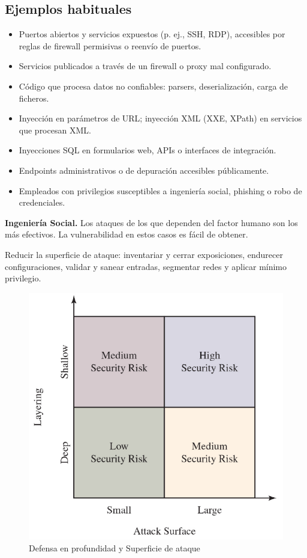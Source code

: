 \documentclass[11pt,a4paper]{article}
\begin{document}
    \subsection*{Ejemplos habituales}
    \begin{itemize}
        \item Puertos abiertos y servicios expuestos (p. ej., SSH, RDP), accesibles por reglas de firewall permisivas o reenvío de puertos.
        \item Servicios publicados a través de un firewall o proxy mal configurado.
        \item Código que procesa datos no confiables: parsers, deserialización, carga de ficheros.
        \item Inyección en parámetros de URL; inyección XML (XXE, XPath) en servicios que procesan XML.
        \item Inyecciones SQL en formularios web, APIs o interfaces de integración.
        \item Endpoints administrativos o de depuración accesibles públicamente.
        \item Empleados con privilegios susceptibles a ingeniería social, phishing o robo de credenciales.
    \end{itemize}

    \begin{NotaBox}
    \textbf{Ingeniería Social.} Los ataques de los que dependen del factor humano son los más efectivos. La vulnerabilidad en estos casos es fácil de obtener.
    \end{NotaBox}

    \begin{NotaBox}
    Reducir la superficie de ataque: inventariar y cerrar exposiciones, endurecer configuraciones, validar y sanear entradas, segmentar redes y aplicar mínimo privilegio.
    \end{NotaBox}

    \begin{figure}[htbp]
        \centering
        \includegraphics[width=0.5\linewidth]{resources/fig1.png}
        \caption{Defensa en profundidad y Superficie de ataque}
        \label{fig:defensa-profundidad-superficie-ataque}
    \end{figure}
\end{document}
